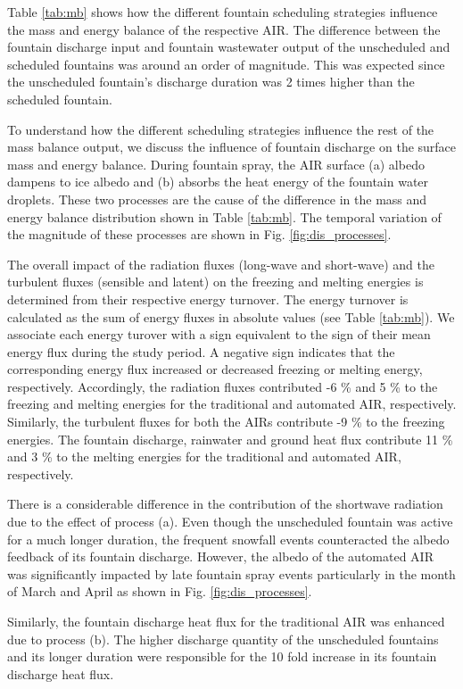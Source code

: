 \documentclass[tc, manuscript]{copernicus}
\begin{document}
Table \ref{tab:mb} shows how the different fountain scheduling strategies influence the mass and energy balance
of the respective AIR. The difference between the fountain discharge input and fountain wastewater output of the
unscheduled and scheduled fountains was around an order of magnitude. This was expected since the unscheduled
fountain's discharge duration was 2 times higher than the scheduled fountain.

To understand how the different scheduling strategies influence the rest of the mass balance output, we discuss
the influence of fountain discharge on the surface mass and energy balance. During fountain spray, the AIR
surface (a) albedo dampens to ice albedo and (b) absorbs the heat energy of the fountain water droplets. These
two processes are the cause of the difference in the mass and energy balance distribution shown in Table
\ref{tab:mb}. The temporal variation of the magnitude of these processes are shown in Fig.
\ref{fig:dis_processes}. 

The overall impact of the radiation fluxes (long-wave and short-wave) and the turbulent fluxes (sensible and
latent) on the freezing and melting energies is determined from their respective energy turnover. The energy
turnover is calculated as the sum of energy fluxes in absolute values (see Table \ref{tab:mb}). We associate
each energy turover with a sign equivalent to the sign of their mean energy flux during the study period. A
negative sign indicates that the corresponding energy flux increased or decreased freezing or melting energy,
respectively. Accordingly, the radiation fluxes contributed -6 \% and 5 \% to the freezing and melting energies
for the traditional and automated AIR, respectively.  Similarly, the turbulent fluxes for both the AIRs
contribute -9 \% to the freezing energies. The fountain discharge, rainwater and ground heat flux contribute 11
\% and 3 \% to the melting energies for the traditional and automated AIR, respectively. 

There is a considerable difference in the contribution of the shortwave radiation due to the effect of process
(a). Even though the unscheduled fountain was active for a much longer duration, the frequent snowfall events
counteracted the albedo feedback of its fountain discharge. However, the albedo of the automated AIR was
significantly impacted by late fountain spray events particularly in the month of March and April as shown in
Fig. \ref{fig:dis_processes}.

Similarly, the fountain discharge heat flux for the traditional AIR was enhanced due to process (b). The higher
discharge quantity of the unscheduled fountains and its longer duration were responsible for the 10 fold
increase in its fountain discharge heat flux.
\end{document}
